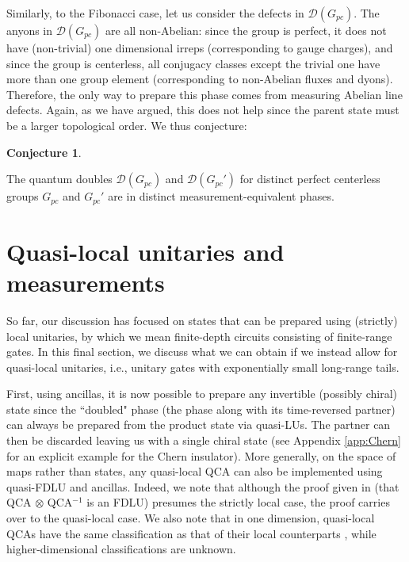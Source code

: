 \documentclass[nofootinbib,prx,twocolumn,showpacs,superscriptaddress,notitlepage,amsmath,amssymb]{revtex4-2}
\theoremstyle{definition}
\newtheorem{conjecture}[theorem]{Conjecture}
\begin{document}
Similarly, to the Fibonacci case, let us consider the defects in $\mathcal D(G_{pc})$. The anyons in $\mathcal D(G_{pc})$ are all non-Abelian: since the group is perfect, it does not have (non-trivial) one dimensional irreps (corresponding to gauge charges), and since the group is centerless, all conjugacy classes except the trivial one have more than one group element (corresponding to non-Abelian fluxes and dyons). Therefore, the only way to prepare this phase comes from measuring Abelian line defects. Again, as we have argued, this does not help since the parent state must be a larger topological order. We thus conjecture:

\begin{conjecture}
\begin{shaded}
The quantum doubles $\mathcal D(G_{pc})$ and $\mathcal D(G_{pc}')$ for distinct perfect centerless groups $G_{pc}$ and $G_{pc}'$ are in distinct measurement-equivalent phases.
\end{shaded}
\end{conjecture}




\section{Quasi-local unitaries and measurements}\label{sec:qFDLU}
So far, our discussion has focused on states that can be prepared using (strictly) local unitaries, by which we mean finite-depth circuits consisting of finite-range gates. In this final section, we discuss what we can obtain if we instead allow for quasi-local unitaries, i.e., unitary gates with exponentially small long-range tails.

First, using ancillas, it is now possible to prepare any invertible (possibly chiral) state since the ``doubled" phase (the phase along with its time-reversed partner) can always be prepared from the product state via quasi-LUs\cite{Barbarino20}. The partner can then be discarded leaving us with a single chiral state (see Appendix \ref{app:Chern} for an explicit example for the Chern insulator). More generally, on the space of maps rather than states, any quasi-local QCA can also be implemented using quasi-FDLU and ancillas. Indeed, we note that although the proof given in \cite{HaahFidkowskiHastings18} (that QCA $\otimes$ QCA$^{-1}$ is an FDLU) presumes the strictly local case, the proof carries over to the quasi-local case. We also note that in one dimension, quasi-local QCAs have the same classification as that of their local counterparts \cite{Ranard20}, while higher-dimensional classifications are unknown.
\end{document}
